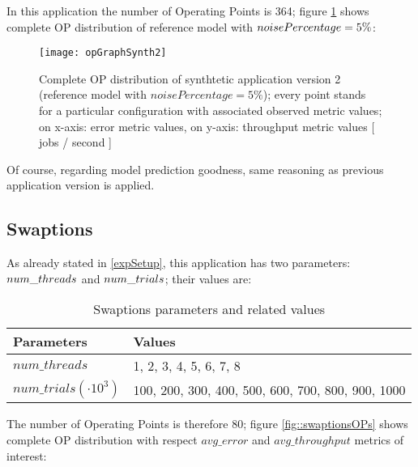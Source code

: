 In this application the number of Operating Points is 364; figure \ref{fig::opListSynth2} shows complete OP distribution of reference model with $noise\-Per\-cent\-age = 5\%$:

\begin{figure}[H]

    \centering
    \texttt{[image: opGraphSynth2]}
    \caption[Complete OP distribution of synthtetic application version 2]{Complete OP distribution of synthtetic application version 2 (reference model with $noisePercentage = 5\%$); every point stands for a particular configuration with associated observed metric values; on x-axis: error metric values, on y-axis: throughput metric values [ jobs / second ]}
    \label{fig::opListSynth2}
    
\end{figure}

Of course, regarding model prediction goodness, same reasoning as previous application version is applied.


\subsection{Swaptions}

As already stated in \ref{expSetup}, this application has two parameters: $num\_\-threads$ and $num\_\-trials$; their values are:

\begin{table}[H]

    \centering

    \begin{tabular}{ll}
    
        \toprule
        Parameters & Values \\
        \midrule
        $num\_threads$ & 1, 2, 3, 4, 5, 6, 7, 8 \\
        $num\_trials (\cdot 10^3)$ & 100, 200, 300, 400, 500, 600, 700, 800, 900, 1000 \\
        \bottomrule 
    
    \end{tabular}

    \caption{Swaptions parameters and related values}

\end{table}

The number of Operating Points is therefore 80; figure \ref{fig::swaptionsOPs} shows complete OP distribution with respect $avg\_error$ and $avg\_throughput$ metrics of interest:

